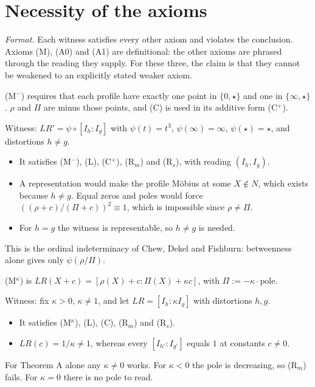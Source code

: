 \section{Necessity of the axioms}

\emph{Format.} Each witness satisfies every other axiom and violates the conclusion. Axioms (M), (A0) and (A1) are definitional: the other axioms are phrased through the reading they supply. For these three, the claim is that they cannot be weakened to an explicitly stated weaker axiom.

\begin{example}
(M$^-$) requires that each profile have exactly one point in $\{0,\star\}$ and one in $\{\infty,\star\}$. $\rho$ and $\Pi$ are minus those points, and (C) is used in its additive form (C$^+$).

Witness: $LR'=\psi\circ[I_h:I_g]$ with $\psi(t)=t^3$, $\psi(\infty)=\infty$, $\psi(\star)=\star$, and distortions $h\neq g$.
\begin{itemize}
\item It satisfies (M$^-$), (L), (C$^+$), (R$_m$) and (R$_s$), with reading $(I_h,I_g)$.
\item A representation would make the profile M\"obius at some $X\notin N$, which exists because $h\ne g$. Equal zeros and poles would force $((\rho+c)/(\Pi+c))^2\equiv1$, which is impossible since $\rho\neq\Pi$.
\item For $h=g$ the witness is representable, so $h\ne g$ is needed.
\end{itemize}
This is the ordinal indeterminacy of Chew, Dekel and Fishburn: betweenness alone gives only $\psi(\rho/\Pi)$.
\end{example}

\begin{example}
(M$^\kappa$) is $LR(X+c)=[\rho(X)+c:\Pi(X)+\kappa c]$, with $\Pi:=-\kappa\cdot\text{pole}$.

Witness: fix $\kappa>0$, $\kappa\neq1$, and let $LR=[I_h:\kappa I_g]$ with distortions $h,g$.
\begin{itemize}
\item It satisfies (M$^\kappa$), (L), (C), (R$_m$) and (R$_s$).
\item $LR(c)=1/\kappa\neq1$, whereas every $[I_{h'}:I_{g'}]$ equals $1$ at constants $c\ne0$.
\end{itemize}
For Theorem A alone any $\kappa\neq0$ works. For $\kappa<0$ the pole is decreasing, so (R$_m$) fails. For $\kappa=0$ there is no pole to read.
\end{example}

